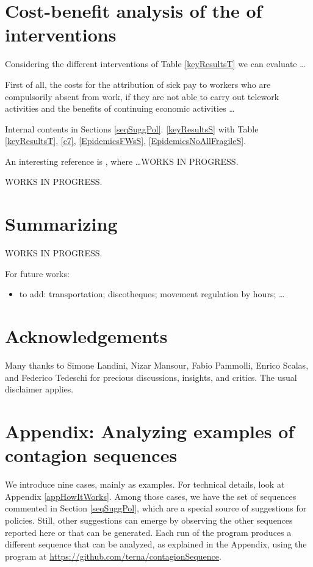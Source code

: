 \documentclass[11pt]{article}
\begin{document}
\section{Cost-benefit analysis of the of interventions}
\label{CBanalysis}

Considering  the different interventions of Table \ref{keyResultsT} we can evaluate \ldots

First of all, the costs for the attribution of sick pay to workers who are compulsorily absent from work, if they are not able to carry out telework activities and the benefits of continuing economic activities \ldots

Internal contents in Sections \ref{seqSuggPol}. 
\ref{keyResultsS} with Table \ref{keyResultsT}, \ref{c7}, 
\ref{EpidemicsFWsS}, 
\ref{EpidemicsNoAllFragileS}.

An interesting reference is \cite{doi:10.1111/ijcp.13674}, where \ldots WORKS IN PROGRESS.

WORKS IN PROGRESS.


\section{Summarizing}

WORKS IN PROGRESS.

For future works:
\begin{itemize}

\item to add: transportation; discotheques; movement regulation by hours; \ldots

\end{itemize}

\section*{Acknowledgements}

Many thanks to Simone Landini, Nizar Mansour, Fabio Pammolli, Enrico Scalas, and Federico Tedeschi for precious discussions, insights, and critics. The usual disclaimer applies.

\appendix

\section{Appendix: Analyzing examples of contagion sequences}
\label{appContagion}

We introduce nine cases, mainly as examples. For technical details, look at Appendix \ref{appHowItWorks}. Among those cases, we have the set of sequences commented in Section \ref{seqSuggPol}, which are a special source of suggestions for policies. Still, other suggestions can emerge by observing the other sequences reported here or that can be generated. Each run of the program produces a different sequence that can be analyzed, as explained in the Appendix, using the program at \url{https://github.com/terna/contagionSequence}.
\end{document}
